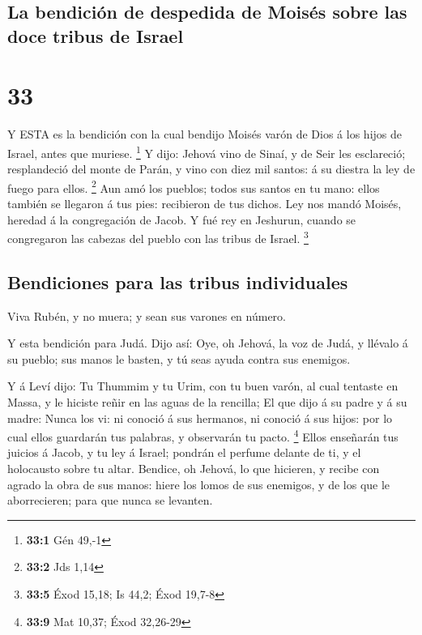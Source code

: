 \hypertarget{la-bendiciuxf3n-de-despedida-de-moisuxe9s-sobre-las-doce-tribus-de-israel}{%
\subsection{La bendición de despedida de Moisés sobre las doce tribus de
Israel}\label{la-bendiciuxf3n-de-despedida-de-moisuxe9s-sobre-las-doce-tribus-de-israel}}

\hypertarget{section-32}{%
\section{33}\label{section-32}}

 Y ESTA es la bendición con la cual bendijo Moisés varón de
Dios á los hijos de Israel, antes que muriese. \footnote{\textbf{33:1}
  Gén 49,-1}  Y dijo: Jehová vino de Sinaí, y de Seir les
esclareció; resplandeció del monte de Parán, y vino con diez mil santos:
á su diestra la ley de fuego para ellos. \footnote{\textbf{33:2} Jds
  1,14}  Aun amó los pueblos; todos sus santos en tu mano:
ellos también se llegaron á tus pies: recibieron de tus dichos.
 Ley nos mandó Moisés, heredad á la congregación de Jacob.
 Y fué rey en Jeshurun, cuando se congregaron las cabezas
del pueblo con las tribus de Israel. \footnote{\textbf{33:5} Éxod 15,18;
  Is 44,2; Éxod 19,7-8}

\hypertarget{bendiciones-para-las-tribus-individuales}{%
\subsection{Bendiciones para las tribus
individuales}\label{bendiciones-para-las-tribus-individuales}}

 Viva Rubén, y no muera; y sean sus varones en número.

 Y esta bendición para Judá. Dijo así: Oye, oh Jehová, la
voz de Judá, y llévalo á su pueblo; sus manos le basten, y tú seas ayuda
contra sus enemigos.

 Y á Leví dijo: Tu Thummim y tu Urim, con tu buen varón, al
cual tentaste en Massa, y le hiciste reñir en las aguas de la rencilla;
 El que dijo á su padre y á su madre: Nunca los vi: ni
conoció á sus hermanos, ni conoció á sus hijos: por lo cual ellos
guardarán tus palabras, y observarán tu pacto. \footnote{\textbf{33:9}
  Mat 10,37; Éxod 32,26-29}  Ellos enseñarán tus juicios á
Jacob, y tu ley á Israel; pondrán el perfume delante de ti, y el
holocausto sobre tu altar.  Bendice, oh Jehová, lo que
hicieren, y recibe con agrado la obra de sus manos: hiere los lomos de
sus enemigos, y de los que le aborrecieren; para que nunca se levanten.

